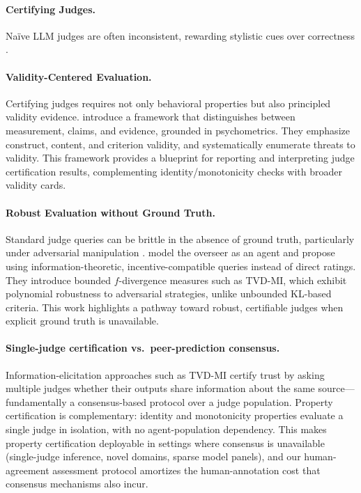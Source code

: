 \documentclass{article}
\begin{document}
\paragraph{Certifying Judges.}
Naïve LLM judges are often inconsistent, rewarding stylistic cues over correctness \citep{Kocmi2024HumanVsLLM,Li2024TrustLLMJudgments}.

\paragraph{Validity-Centered Evaluation.}
Certifying judges requires not only behavioral properties but also principled validity evidence. \citet{salaudeen2025measurement} introduce a framework that distinguishes between measurement, claims, and evidence, grounded in psychometrics. They emphasize construct, content, and criterion validity, and systematically enumerate threats to validity. This framework provides a blueprint for reporting and interpreting judge certification results, complementing identity/monotonicity checks with broader validity cards.

\paragraph{Robust Evaluation without Ground Truth.}
Standard judge queries can be brittle in the absence of ground truth, particularly under adversarial manipulation \citep{Zhuo2024ICEScore,TongZhang2024CodeJudge}. \citet{robertson2025stepbystep} model the overseer as an agent and propose using information-theoretic, incentive-compatible queries instead of direct ratings. They introduce bounded $f$-divergence measures such as TVD-MI, which exhibit polynomial robustness to adversarial strategies, unlike unbounded KL-based criteria. This work highlights a pathway toward robust, certifiable judges when explicit ground truth is unavailable.

\paragraph{Single-judge certification vs.\ peer-prediction consensus.}
Information-elicitation approaches such as TVD-MI \citep{robertson2025stepbystep} certify trust by asking multiple judges whether their outputs share information about the same source---fundamentally a consensus-based protocol over a judge population.
Property certification is complementary: identity and monotonicity properties evaluate a single judge in isolation, with no agent-population dependency.
This makes property certification deployable in settings where consensus is unavailable (single-judge inference, novel domains, sparse model panels), and our human-agreement assessment protocol amortizes the human-annotation cost that consensus mechanisms also incur.
\end{document}
